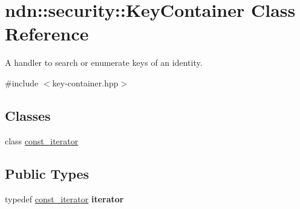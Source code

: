 \hypertarget{classndn_1_1security_1_1KeyContainer}{}\section{ndn\+:\+:security\+:\+:Key\+Container Class Reference}
\label{classndn_1_1security_1_1KeyContainer}


A handler to search or enumerate keys of an identity.  




{\ttfamily \#include $<$key-\/container.\+hpp$>$}

\subsection*{Classes}
\begin{DoxyCompactItemize}
\item 
class \hyperlink{classndn_1_1security_1_1KeyContainer_1_1const__iterator}{const\+\_\+iterator}
\end{DoxyCompactItemize}
\subsection*{Public Types}
\begin{DoxyCompactItemize}
\item 
typedef \hyperlink{classndn_1_1security_1_1KeyContainer_1_1const__iterator}{const\+\_\+iterator} {\bfseries iterator}\hypertarget{classndn_1_1security_1_1KeyContainer_ad52bfc8bd829b8cc7483d3698943d3bf}{}\label{classndn_1_1security_1_1KeyContainer_ad52bfc8bd829b8cc7483d3698943d3bf}

\end{DoxyCompactItemize}
